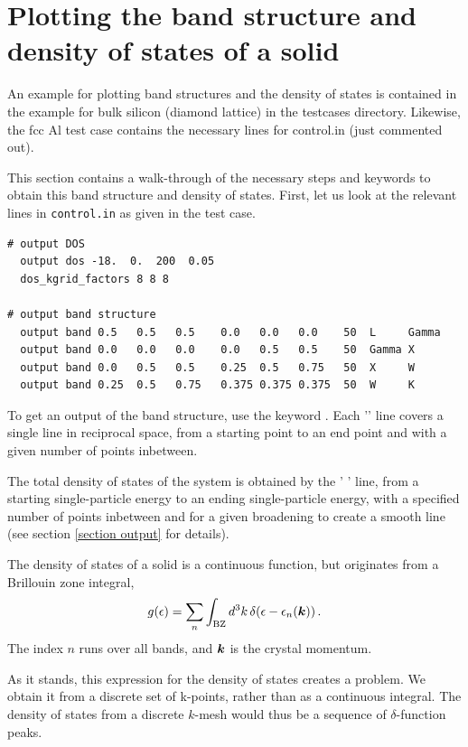 \section{Plotting the band structure and density of states of a solid}
\label{band and dos plotting}

An example for plotting band structures and the
density of states is contained in the example for bulk silicon (diamond
lattice) in the testcases directory. Likewise, the fcc Al test case contains 
the necessary lines for control.in (just commented out).

This
section contains a walk-through of the necessary steps and keywords to
obtain this band structure and density of states. First, let us look
at the relevant lines in \texttt{control.in} as given in the test case.

\small
\begin{verbatim}
# output DOS
  output dos -18.  0.  200  0.05
  dos_kgrid_factors 8 8 8

# output band structure
  output band 0.5   0.5   0.5    0.0   0.0   0.0    50  L     Gamma
  output band 0.0   0.0   0.0    0.0   0.5   0.5    50  Gamma X
  output band 0.0   0.5   0.5    0.25  0.5   0.75   50  X     W
  output band 0.25  0.5   0.75   0.375 0.375 0.375  50  W     K
\end{verbatim}
\normalsize

To get an output of the band structure, use the keyword 
. Each '' line
covers a single line in reciprocal space, from a starting point to an
end point and with a given number of points inbetween.

The total density of states of the system is obtained by the
' ' line, from a starting 
single-particle energy to an ending single-particle energy, with a
specified number of points inbetween and for a given broadening to
create a smooth line (see section \ref{section output} for details).

The density of states of a solid is a continuous function, but
originates from a Brillouin zone integral, 
\begin{equation}\label{Eq:DOS}
  g(\epsilon) = \sum_n \int_\text{BZ} d^3k \, \delta (\epsilon -
                                   \epsilon_n(\mbox{\boldmath$k$})) \, .
\end{equation}
The index $n$ runs over all bands, and $\mbox{\boldmath$k$}$ is the crystal momentum.

As it stands, this expression for the density of states creates a
problem. We obtain it from a discrete set of k-points, rather than as
a continuous integral. The density of states from a discrete $k$-mesh
would thus be a sequence of $\delta$-function peaks.

